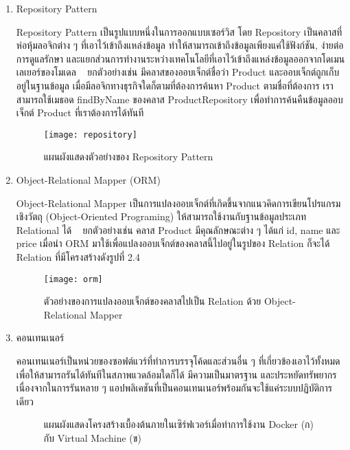 \begin{enumerate}
	\item Repository Pattern
	
	Repository Pattern เป็นรูปแบบหนึ่งในการออกแบบเซอร์วิส โดย Repository เป็นคลาสที่ห่อหุ้มลอจิกต่าง ๆ ที่เอาไว้เข้าถึงแหล่งข้อมูล ทำให้สามารถเข้าถึงข้อมูลเพียงแค่ใช้ฟังก์ชัน, ง่ายต่อการดูแลรักษา และแยกส่วนการทำงานระหว่างเทคโนโลยีที่เอาไว้เข้าถึงแหล่งข้อมูลออกจากโดเมนเลเยอร์ของโมเดล ~\cite{repositorypattern} ยกตัวอย่างเช่น มีคลาสของออบเจ็กต์ชื่อว่า Product และออบเจ็กต์ถูกเก็บอยู่ในฐานข้อมูล เมื่อมีลอจิกทางธุรกิจใดก็ตามที่ต้องการค้นหา Product ตามชื่อที่ต้องการ เราสามารถใช้เมธอด findByName ของคลาส ProductRepository เพื่อทำการค้นคืนข้อมูลออบเจ็กต์ Product ที่เราต้องการได้ทันที
	
	\begin{figure}[!h]
		\centering
		\texttt{[image: repository]}  
		\caption{แผนผังแสดงตัวอย่างของ Repository Pattern}
		\label{Fig:repository}
	\end{figure}
	
	\item Object-Relational Mapper (ORM)
	
	Object-Relational Mapper เป็นการแปลงออบเจ็กต์ที่เกิดขึ้นจากแนวคิดการเขียนโปรแกรมเชิงวัตถุ (Object-Oriented Programing) ให้สามารถใช้งานกับฐานข้อมูลประเภท Relational ได้ ~\cite{orm} ยกตัวอย่างเช่น คลาส Product มีคุณลักษณะต่าง ๆ ได้แก่ id, name และ price เมื่อนำ ORM มาใช้เพื่อแปลงออบเจ็กต์ของคลาสนี้ไปอยู่ในรูปของ Relation ก็จะได้ Relation ที่มีโครงสร้างดังรูปที่ 2.4
	
	\begin{figure}[!h]
		\centering
		\texttt{[image: orm]}  
		\caption{ตัวอย่างของการแปลงออบเจ็กต์ของคลาสไปเป็น Relation ด้วย Object-Relational Mapper}
		\label{Fig:orm}
	\end{figure}
	
	\item คอนเทนเนอร์
	
	คอนเทนเนอร์เป็นหน่วยของซอฟต์แวร์ที่ทำการบรรจุโค้ดและส่วนอื่น ๆ ที่เกี่ยวข้องเอาไว้ทั้งหมดเพื่อให้สามารถรันได้ทันทีในสภาพแวดล้อมใดก็ได้ มีความเป็นมาตรฐาน และประหยัดทรัพยากร เนื่องจากในการรันหลาย ๆ แอปพลิเคชันที่เป็นคอนเทนเนอร์พร้อมกันจะใช้แค่ระบบปฏิบัติการเดียว
	
	\begin{figure}[!h]
		\centering
		\caption{แผนผังแสดงโครงสร้างเบื้องต้นภายในเซิร์ฟเวอร์เมื่อทำการใช้งาน Docker (ก) กับ Virtual Machine (ข)}
		\label{Fig:infra}
	\end{figure}


\end{enumerate}

